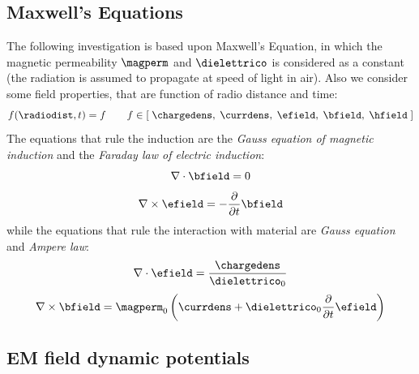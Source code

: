 \subsection{Maxwell's Equations}
The following investigation is based upon Maxwell's Equation, in which the magnetic permeability $\magperm$ and $\dielettrico$ is considered as a constant (the radiation is assumed to propagate at speed of light in air). Also we consider some field properties, that are function of radio distance and time:
\[
f(\radiodist,t) = f \qquad f \in \left[\; \chargedens,\; \currdens,\; \efield,\; \bfield,\; \hfield \; \right]
\]
The equations that rule the induction are the \emph{Gauss equation of magnetic induction} and the \emph{Faraday law of electric induction}:
\begin{equation}
\nabla\cdot\bfield = 0
\label{eq:gauss1}
\end{equation}
\begin{equation}
\nabla\times\efield = -\partialt \bfield
\label{eq:faraday}
\end{equation}
while the equations that rule the interaction with material are \emph{Gauss equation} and \emph{Ampere law}:
\begin{equation}
\nabla\cdot\efield = \dfrac{\chargedens}{{\dielettrico}_0}
\label{eq:gauss2}
\end{equation}
\begin{equation}
\nabla\times\bfield = {\magperm}_0 \left( \currdens + {\dielettrico}_0 \partialt \efield \right)
\label{eq:ampere}
\end{equation}

\subsection{EM field dynamic potentials}

